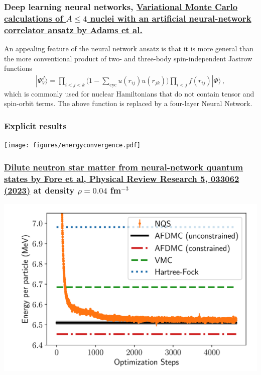 \documentclass{beamer}
\begin{document}
\begin{frame}
\frametitle{Deep learning neural networks, \href{{https://journals.aps.org/prl/abstract/10.1103/PhysRevLett.127.022502}}{Variational Monte Carlo calculations of $A\le 4$ nuclei with an artificial neural-network correlator ansatz by Adams et al.}}

An appealing feature of the neural network ansatz is that it is more general than the more conventional product of two-
and three-body spin-independent Jastrow functions
\begin{align}
|\Psi_V^J \rangle = \prod_{i<j<k} \Big( 1-\sum_{\text{cyc}} u(r_{ij}) u(r_{jk})\Big) \prod_{i<j} f(r_{ij}) | \Phi\rangle\,,
\end{align}
which is commonly used for nuclear Hamiltonians that do not contain tensor and spin-orbit terms.
The above function is replaced by a four-layer Neural Network.
\end{frame}

\begin{frame}
\frametitle{Explicit results}

\vspace{6mm}

\centerline{\texttt{[image: figures/energyconvergence.pdf]}}

\vspace{6mm}
\end{frame}

\begin{frame}
\frametitle{\href{{https://journals.aps.org/prresearch/pdf/10.1103/PhysRevResearch.5.033062}}{Dilute neutron star matter from neural-network quantum states by Fore et al, Physical Review Research 5, 033062 (2023)} at density $\rho=0.04$ fm$^{-3}$}

\begin{block}{}

\vspace{6mm}

\centerline{\includegraphics[width=0.9\linewidth]{figures/nmatter.png}}

\vspace{6mm}

\end{block}
\end{frame}
\end{document}
